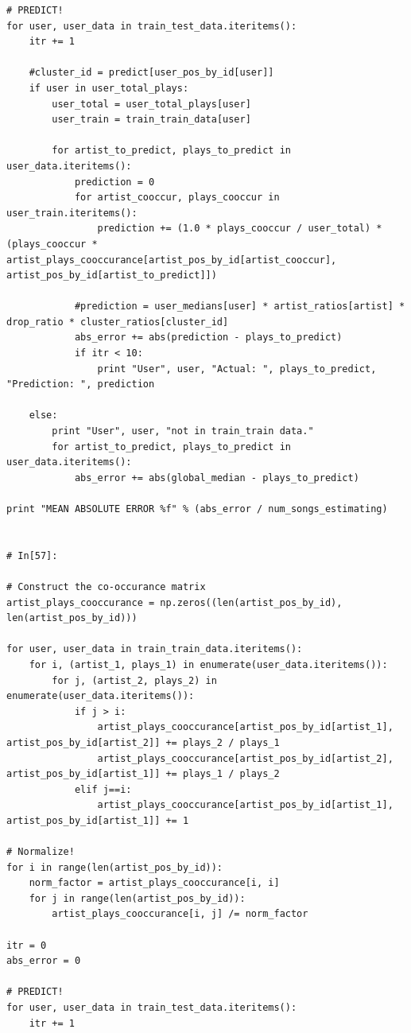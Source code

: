 \documentclass[11pt]{article}
\begin{document}
\begin{lstlisting}
# PREDICT!
for user, user_data in train_test_data.iteritems():
    itr += 1
    
    #cluster_id = predict[user_pos_by_id[user]]
    if user in user_total_plays:
        user_total = user_total_plays[user]
        user_train = train_train_data[user]
    
        for artist_to_predict, plays_to_predict in user_data.iteritems():
            prediction = 0
            for artist_cooccur, plays_cooccur in user_train.iteritems():
                prediction += (1.0 * plays_cooccur / user_total) * (plays_cooccur * artist_plays_cooccurance[artist_pos_by_id[artist_cooccur], artist_pos_by_id[artist_to_predict]])
        
            #prediction = user_medians[user] * artist_ratios[artist] * drop_ratio * cluster_ratios[cluster_id]
            abs_error += abs(prediction - plays_to_predict) 
            if itr < 10:
                print "User", user, "Actual: ", plays_to_predict, "Prediction: ", prediction

    else:
        print "User", user, "not in train_train data."
        for artist_to_predict, plays_to_predict in user_data.iteritems():
            abs_error += abs(global_median - plays_to_predict)
            
print "MEAN ABSOLUTE ERROR %f" % (abs_error / num_songs_estimating)


# In[57]:

# Construct the co-occurance matrix
artist_plays_cooccurance = np.zeros((len(artist_pos_by_id), len(artist_pos_by_id)))

for user, user_data in train_train_data.iteritems():
    for i, (artist_1, plays_1) in enumerate(user_data.iteritems()):
        for j, (artist_2, plays_2) in enumerate(user_data.iteritems()):
            if j > i:
                artist_plays_cooccurance[artist_pos_by_id[artist_1], artist_pos_by_id[artist_2]] += plays_2 / plays_1
                artist_plays_cooccurance[artist_pos_by_id[artist_2], artist_pos_by_id[artist_1]] += plays_1 / plays_2
            elif j==i:
                artist_plays_cooccurance[artist_pos_by_id[artist_1], artist_pos_by_id[artist_1]] += 1
            
# Normalize!
for i in range(len(artist_pos_by_id)):
    norm_factor = artist_plays_cooccurance[i, i]
    for j in range(len(artist_pos_by_id)):
        artist_plays_cooccurance[i, j] /= norm_factor

itr = 0
abs_error = 0
    
# PREDICT!
for user, user_data in train_test_data.iteritems():
    itr += 1
    

\end{lstlisting}
\end{document}

